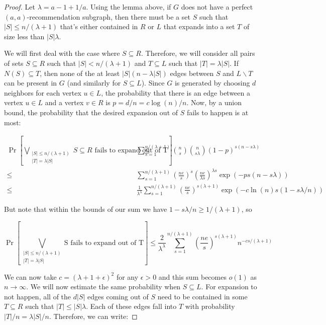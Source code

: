 \begin{proof}
Let $\lambda = a - 1 + 1/a$. Using the lemma above, if $G$ does not have a perfect $(a,a)$-recommendation subgraph, then there must be a set $S$ such that $|S|\leq n/(\lambda+1)$ that's either contained in $R$ or $L$ that expands into a set $T$ of size less than $|S|\lambda$. \vs

We will first deal with the case where $S\subseteq R$. Therefore, we will consider all pairs of sets $S\subseteq R$ such that $|S|<n/(\lambda+1)$ and $T\subseteq L$ such that $|T| = \lambda|S|$. If $N(S)\subseteq T$, then none of the at least $|S|(n-\lambda |S|)$ edges between $S$ and $L\backslash T$ can be present in $G$ (and similarly for $S\subseteq L$). Since $G$ is generated by choosing $d$ neighbors for each vertex $u\in L$, the probability that there is an edge between a vertex $u\in L$ and a vertex $v\in R$ is $p = d/n = c\log(n)/n$. Now, by a union bound, the probability that the desired expansion out of $S$ fails to happen is at most: 

\begin{align*}
       \Pr\left[\bigvee_{\substack{|S|\leq n/(\lambda+1) \\ |T| = \lambda |S|}} \text{$S\subseteq R$ fails to expand out of T}\right]
\leq&  \sum_{s=1}^{n/(\lambda+1)} \binom{n}{s}\binom{n}{s\lambda}(1-p)^{s(n-s\lambda)} \\
\leq&  \sum_{s=1}^{n/(\lambda+1)} \left(\frac{ne}{s}\right)^s \left(\frac{ne}{\lambda s}\right)^{\lambda s} \exp\left(-ps(n-s\lambda)\right) \\
\leq&  \frac{1}{\lambda^\lambda} \sum_{s=1}^{n/(\lambda+1)} \left(\frac{ne}{s}\right)^{s(\lambda+1)} \exp\left(-c\ln(n)s(1-s\lambda/n)\right)
\end{align*}

But note that within the bounds of our sum we have $1-s\lambda/n \geq 1/(\lambda+1)$, so

\[
\Pr\left[\bigvee_{\substack{|S|\leq n/(\lambda+1) \\ |T| = \lambda |S|}} \text{S fails to expand out of T}\right]
\leq \frac{2}{\lambda^\lambda} \sum_{s=1}^{n/(\lambda+1)} \left(\frac{ne}{s}\right)^{s(\lambda+1)} n^{-cs/(\lambda+1)}
\]

We can now take $c=(\lambda+1+\epsilon)^2$ for any $\epsilon>0$ and this sum becomes $o(1)$ as $n\to\infty$. We will now estimate the same probability when $S\subseteq L$. For expansion to not happen, all of the $d|S|$ edges coming out of $S$ need to be contained in some $T\subseteq R$ such that $|T|\leq |S|\lambda$. Each of these edges fall into $T$ with probability $|T|/n = \lambda|S|/n$. Therefore, we can write:


\end{proof}
